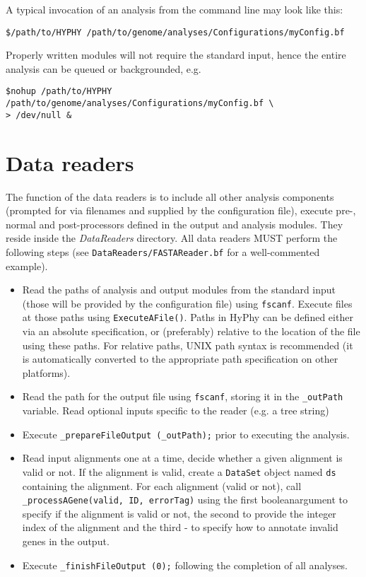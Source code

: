 \documentclass[12pt]{article}
\begin{document}
A typical invocation of an analysis from the command line may look like this:
\begin{verbatim}
$/path/to/HYPHY /path/to/genome/analyses/Configurations/myConfig.bf
\end{verbatim}

Properly written modules will not require the standard input, hence the entire analysis can be queued or backgrounded, e.g. 

\begin{verbatim}
$nohup /path/to/HYPHY /path/to/genome/analyses/Configurations/myConfig.bf \
> /dev/null &
\end{verbatim}

\section{Data readers}

The function of the data readers is to include all other analysis components (prompted for via filenames and supplied by the configuration file),
execute pre-, normal and post-processors defined in the output and analysis modules. They reside inside the \textit{DataReaders} directory. 
All data readers MUST perform the following steps (see {\tt DataReaders/FASTAReader.bf} for a well-commented example).

\begin{itemize}
\item Read the paths of analysis and output modules from the standard input (those will be provided by the configuration file) using {\tt fscanf}. Execute files at those paths using {\tt ExecuteAFile()}. Paths in HyPhy can be defined either via an absolute specification, or (preferably) relative to the location of the file using these paths. For relative paths, UNIX path syntax is recommended (it is automatically converted to 
the appropriate path specification on other platforms). 

\item Read the path for the output file using {\tt fscanf}, storing it in the {\tt \_outPath} variable. Read optional inputs specific to the 
reader (e.g. a tree string)

\item Execute {\tt \_prepareFileOutput (\_outPath);} prior to executing the analysis.

\item Read input alignments one at a time, decide whether a given alignment is valid or not. If the alignment is valid, create a {\tt DataSet} object named {\tt ds} containing the alignment. For each alignment (valid or not), call {\tt \_processAGene(valid, ID, errorTag)} using the first booleanargument to specify if the alignment is valid or not, the second to provide the integer index of the alignment and the third - to specify how to annotate invalid genes in the output. 

\item Execute {\tt \_finishFileOutput (0);} following the completion of all analyses. 

\end{itemize}
 
\end{document}
